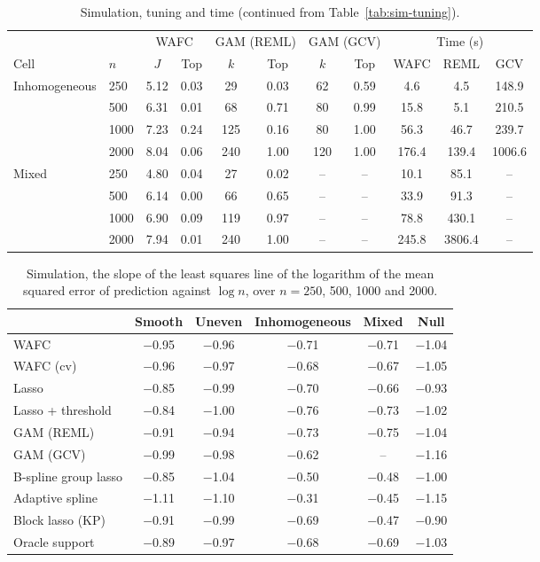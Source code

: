 \begin{table}[tp]
\caption{Simulation, tuning and time (continued from Table~\ref{tab:sim-tuning}).}
\label{tab:sim-tuning-b}
\centering
\footnotesize
\setlength{\tabcolsep}{4pt}
\begin{tabular}{ll cc cc cc ccc}
\hline
 & & \multicolumn{2}{c}{WAFC} & \multicolumn{2}{c}{GAM (REML)} & \multicolumn{2}{c}{GAM (GCV)} & \multicolumn{3}{c}{Time (s)} \\
Cell & $n$ & $J$ & Top & $k$ & Top & $k$ & Top & WAFC & REML & GCV \\
\hline
Inhomogeneous & 250 & 5.12 & 0.03 & 29 & 0.03 & 62 & 0.59 & 4.6 & 4.5 & 148.9 \\
 & 500 & 6.31 & 0.01 & 68 & 0.71 & 80 & 0.99 & 15.8 & 5.1 & 210.5 \\
 & 1000 & 7.23 & 0.24 & 125 & 0.16 & 80 & 1.00 & 56.3 & 46.7 & 239.7 \\
 & 2000 & 8.04 & 0.06 & 240 & 1.00 & 120 & 1.00 & 176.4 & 139.4 & 1006.6 \\
Mixed & 250 & 4.80 & 0.04 & 27 & 0.02 & -- & -- & 10.1 & 85.1 & -- \\
 & 500 & 6.14 & 0.00 & 66 & 0.65 & -- & -- & 33.9 & 91.3 & -- \\
 & 1000 & 6.90 & 0.09 & 119 & 0.97 & -- & -- & 78.8 & 430.1 & -- \\
 & 2000 & 7.94 & 0.01 & 240 & 1.00 & -- & -- & 245.8 & 3806.4 & -- \\
\hline
\end{tabular}
\end{table}

\begin{table}[tp]
\caption{Simulation, the slope of the least squares line of the logarithm of the mean squared error of prediction against $\log n$, over $n = 250$, 500, 1000 and 2000.}
\label{tab:sim-slopes}
\centering
\small
\setlength{\tabcolsep}{6pt}
\begin{tabular}{lccccc}
\hline
 & Smooth & Uneven & Inhomogeneous & Mixed & Null \\
\hline
WAFC & $-$0.95 & $-$0.96 & $-$0.71 & $-$0.71 & $-$1.04 \\
WAFC (cv) & $-$0.96 & $-$0.97 & $-$0.68 & $-$0.67 & $-$1.05 \\
Lasso & $-$0.85 & $-$0.99 & $-$0.70 & $-$0.66 & $-$0.93 \\
Lasso + threshold & $-$0.84 & $-$1.00 & $-$0.76 & $-$0.73 & $-$1.02 \\
GAM (REML) & $-$0.91 & $-$0.94 & $-$0.73 & $-$0.75 & $-$1.04 \\
GAM (GCV) & $-$0.99 & $-$0.98 & $-$0.62 & -- & $-$1.16 \\
B-spline group lasso & $-$0.85 & $-$1.04 & $-$0.50 & $-$0.48 & $-$1.00 \\
Adaptive spline & $-$1.11 & $-$1.10 & $-$0.31 & $-$0.45 & $-$1.15 \\
Block lasso (KP) & $-$0.91 & $-$0.99 & $-$0.69 & $-$0.47 & $-$0.90 \\
Oracle support & $-$0.89 & $-$0.97 & $-$0.68 & $-$0.69 & $-$1.03 \\
\hline
\end{tabular}
\end{table}

